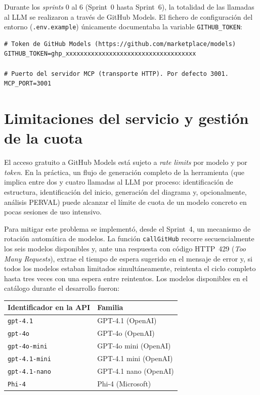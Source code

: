 Durante los \textit{sprints} 0 al 6 (Sprint~0 hasta Sprint~6), la totalidad de las llamadas al LLM se realizaron a través de GitHub Models. El fichero de configuración del entorno (\texttt{.env.example}) únicamente documentaba la variable \texttt{GITHUB\_TOKEN}:

\begin{lstlisting}[style=promptbox]
# Token de GitHub Models (https://github.com/marketplace/models)
GITHUB_TOKEN=ghp_xxxxxxxxxxxxxxxxxxxxxxxxxxxxxxxxxxxx

# Puerto del servidor MCP (transporte HTTP). Por defecto 3001.
MCP_PORT=3001
\end{lstlisting}

\section{Limitaciones del servicio y gestión de la cuota}
\label{sec:anx2-limitaciones}

El acceso gratuito a GitHub Models está sujeto a \textit{rate limits} por modelo y por \textit{token}. En la práctica, un flujo de generación completo de la herramienta (que implica entre dos y cuatro llamadas al LLM por proceso: identificación de estructura, identificación del inicio, generación del diagrama y, opcionalmente, análisis PERVAL) puede alcanzar el límite de cuota de un modelo concreto en pocas sesiones de uso intensivo.

Para mitigar este problema se implementó, desde el Sprint~4, un mecanismo de rotación automática de modelos. La función \texttt{callGitHub} recorre secuencialmente los seis modelos disponibles y, ante una respuesta con código HTTP~429 (\textit{Too Many Requests}), extrae el tiempo de espera sugerido en el mensaje de error y, si todos los modelos estaban limitados simultáneamente, reintenta el ciclo completo hasta tres veces con una espera entre reintentos. Los modelos disponibles en el catálogo durante el desarrollo fueron:

\begin{center}
\begin{tabular}{@{} l l @{}}
\hline
\rule{0pt}{10pt}\textbf{Identificador en la API} & \textbf{Familia} \\
\hline
\rule{0pt}{10pt}\texttt{gpt-4.1}      & GPT-4.1 (OpenAI) \\
\texttt{gpt-4o}       & GPT-4o (OpenAI) \\
\texttt{gpt-4o-mini}  & GPT-4o mini (OpenAI) \\
\texttt{gpt-4.1-mini} & GPT-4.1 mini (OpenAI) \\
\texttt{gpt-4.1-nano} & GPT-4.1 nano (OpenAI) \\
\texttt{Phi-4}        & Phi-4 (Microsoft) \\
\hline
\end{tabular}
\end{center}

